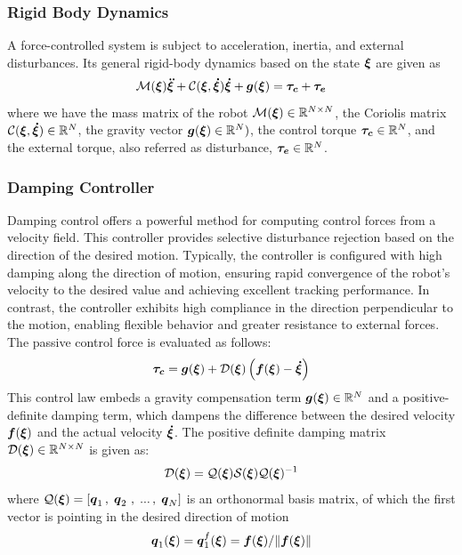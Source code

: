 \subsubsection{Rigid Body Dynamics}
A force-controlled system is subject to acceleration, inertia, and external disturbances. Its general rigid-body dynamics based on the state $\boldsymbol{\xi}$ are given as
\begin{equation}
\mathcal{M}(\boldsymbol{\xi})\boldsymbol{\ddot\xi} + \mathcal{C}(\boldsymbol{\xi}, \boldsymbol{\dot\xi})\boldsymbol{\dot\xi} + \boldsymbol{g}(\boldsymbol{\xi}) = \boldsymbol{\tau_c} + \boldsymbol{\tau_e}
 \label{eq:robot_dynamics}
\end{equation}
where we have the mass matrix of the robot $\mathcal{M}(\boldsymbol{\xi}) \in \mathbb{R}^{N \times N}$, the Coriolis matrix $\mathcal{C}(\boldsymbol{\xi},\boldsymbol{\dot\xi}) \in \mathbb{R}^N$, the gravity vector $\boldsymbol{g}(\boldsymbol{\xi}) \in \mathbb{R}^N)$, the control torque $\boldsymbol{\tau_c} \in \mathbb{R}^N$, and the external torque, also referred as disturbance, $\boldsymbol{\tau_e} \in \mathbb{R}^N$.

\subsubsection{Damping Controller}
Damping control \cite{kronander2015passive} offers a powerful method for computing control forces from a velocity field. This controller provides selective disturbance rejection based on the direction of the desired motion. Typically, the controller is configured with high damping along the direction of motion, ensuring rapid convergence of the robot's velocity to the desired value and achieving excellent tracking performance. In contrast, the controller exhibits high compliance in the direction perpendicular to the motion, enabling flexible behavior and greater resistance to external forces. The passive control force is evaluated as follows:
\begin{equation}
	\boldsymbol{\tau_c} = \boldsymbol{g} (\boldsymbol{\xi}) 
	+ \mathcal{D}(\boldsymbol{\xi}) \left(\boldsymbol{f}(\boldsymbol{\xi}) - \boldsymbol{\dot\xi} \right) 
\label{eq:control_command}
\end{equation}
This control law embeds a gravity compensation term $\boldsymbol{g} (\boldsymbol{\xi}) \in \mathbb{R}^N$ and a positive-definite damping term, which dampens the difference between the desired velocity $\boldsymbol{f}(\boldsymbol{\xi})$ and the actual velocity $\boldsymbol{\dot\xi}$.
The positive definite damping matrix $\mathcal{D}(\boldsymbol{\xi}) \in \mathbb{R}^{N \times N}$ is given as:
\begin{equation}
   \mathcal{D}(\boldsymbol{\xi}) = \mathcal{Q}(\boldsymbol{\xi})\mathcal{S}(\boldsymbol{\xi}) \mathcal{Q} (\boldsymbol{\xi})^{-1}
\label{eq:damping_matrix}
\end{equation}
where $\mathcal{Q}(\boldsymbol{\xi}) = \left[ \boldsymbol{q}_1 \, , \; \boldsymbol{q}_2\ , \; ... \, , \; \boldsymbol{q}_N \right] $ is an orthonormal basis matrix, of which the first vector is pointing in the desired direction of motion
\begin{equation}
    \boldsymbol{q}_1(\boldsymbol{\xi}) = \boldsymbol{q}_1^f(\boldsymbol{\xi}) = \boldsymbol{f}({\boldsymbol{\xi}}) / \lVert \boldsymbol{f}({\boldsymbol{\xi}}) \rVert \label{eq:velocity_unit_vector}
\end{equation}

